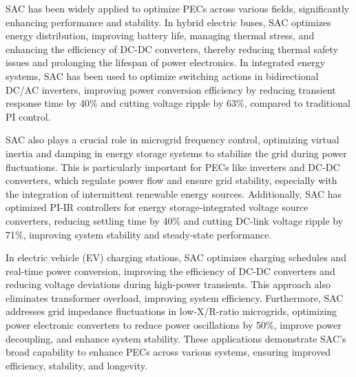 SAC has been widely applied to optimize PECs across various fields, significantly enhancing performance and stability. In hybrid electric buses, SAC optimizes energy distribution, improving battery life, managing thermal stress, and enhancing the efficiency of DC-DC converters, thereby reducing thermal safety issues and prolonging the lifespan of power electronics. In integrated energy systems, SAC has been used to optimize switching actions in bidirectional DC/AC inverters, improving power conversion efficiency by reducing transient response time by 40\% and cutting voltage ripple by 63\%, compared to traditional PI control.

SAC also plays a crucial role in microgrid frequency control, optimizing virtual inertia and damping in energy storage systems to stabilize the grid during power fluctuations. This is particularly important for PECs like inverters and DC-DC converters, which regulate power flow and ensure grid stability, especially with the integration of intermittent renewable energy sources. Additionally, SAC has optimized PI-IR controllers for energy storage-integrated voltage source converters, reducing settling time by 40\% and cutting DC-link voltage ripple by 71\%, improving system stability and steady-state performance.

In electric vehicle (EV) charging stations, SAC optimizes charging schedules and real-time power conversion, improving the efficiency of DC-DC converters and reducing voltage deviations during high-power transients. This approach also eliminates transformer overload, improving system efficiency. Furthermore, SAC addresses grid impedance fluctuations in low-X/R-ratio microgrids, optimizing power electronic converters to reduce power oscillations by 50\%, improve power decoupling, and enhance system stability. These applications demonstrate SAC's broad capability to enhance PECs across various systems, ensuring improved efficiency, stability, and longevity.


